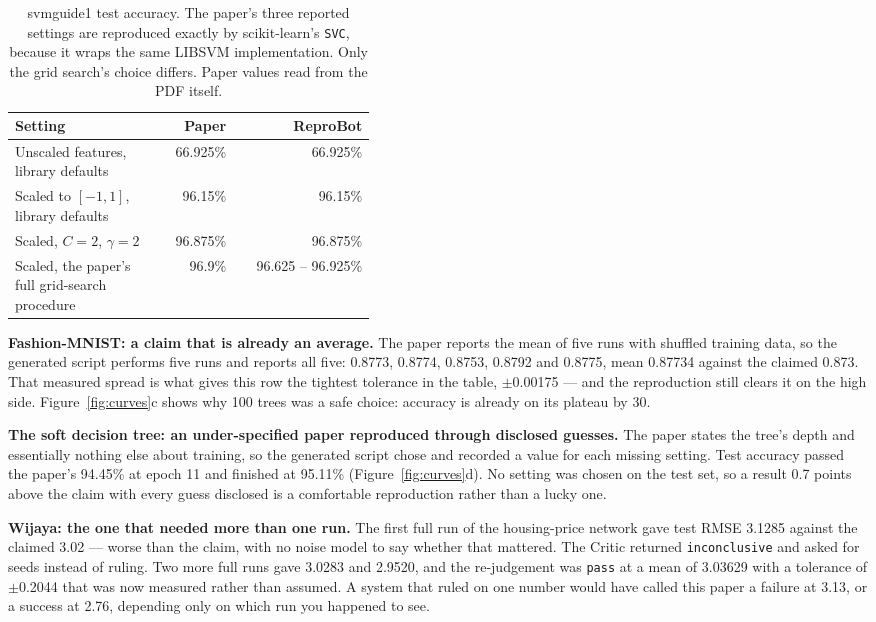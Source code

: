 \documentclass[11pt]{article}
\newcommand{\squeeze}{\setlength{\tabcolsep}{4pt}}
\begin{document}
\begin{table}[tbp]
\centering
\small
\caption{svmguide1 test accuracy. The paper's three reported settings are reproduced exactly by
scikit-learn's \texttt{SVC}, because it wraps the same LIBSVM implementation. Only the grid
search's choice differs. Paper values read from the PDF itself.}
\label{tab:svmexact}
\squeeze
\begin{tabular}{L{0.42\linewidth}rr}
\toprule
Setting & Paper & ReproBot \\
\midrule
Unscaled features, library defaults & 66.925\% & 66.925\% \\
Scaled to $[-1,1]$, library defaults & 96.15\% & 96.15\% \\
Scaled, $C = 2$, $\gamma = 2$ & 96.875\% & 96.875\% \\
Scaled, the paper's full grid-search procedure & 96.9\% & 96.625 -- 96.925\% \\
\bottomrule
\end{tabular}
\end{table}

\textbf{Fashion-MNIST: a claim that is already an average.} The paper reports the mean of five
runs with shuffled training data, so the generated script performs five runs and reports all
five: 0.8773, 0.8774, 0.8753, 0.8792 and 0.8775, mean 0.87734 against the claimed 0.873. That
measured spread is what gives this row the tightest tolerance in the table, $\pm$0.00175 --- and
the reproduction still clears it on the high side. Figure~\ref{fig:curves}c shows why 100 trees
was a safe choice: accuracy is already on its plateau by 30.

\textbf{The soft decision tree: an under-specified paper reproduced through disclosed guesses.}
The paper states the tree's depth and essentially nothing else about training, so the generated
script chose and recorded a value for each missing setting. Test accuracy passed the paper's
94.45\% at epoch 11 and finished at 95.11\% (Figure~\ref{fig:curves}d). No setting was chosen on
the test set, so a result 0.7 points above the claim with every guess disclosed is a comfortable
reproduction rather than a lucky one.

\textbf{Wijaya: the one that needed more than one run.} The first full run of the housing-price
network gave test RMSE 3.1285 against the claimed 3.02 --- worse than the claim, with no noise
model to say whether that mattered. The Critic returned \texttt{inconclusive} and asked for
seeds instead of ruling. Two more full runs gave 3.0283 and 2.9520, and the re-judgement was
\texttt{pass} at a mean of 3.03629 with a tolerance of $\pm$0.2044 that was now measured rather
than assumed. A system that ruled on one number would have called this paper a failure at 3.13,
or a success at 2.76, depending only on which run you happened to see.
\end{document}
